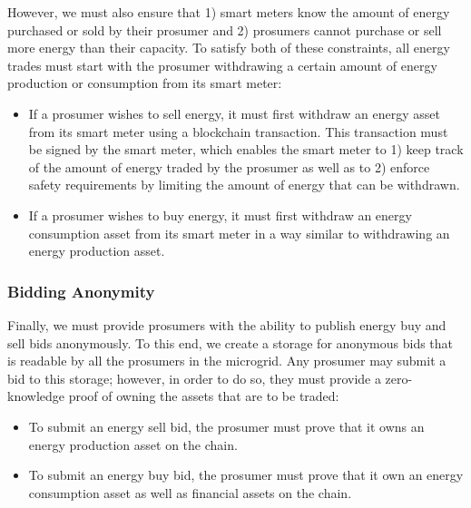 However, we must also ensure that 1) smart meters know the amount of energy purchased or sold by their prosumer and 2) prosumers cannot purchase or sell more energy than their capacity.
To satisfy both of these constraints, all energy trades must start with the prosumer withdrawing a certain amount of energy production or consumption from its smart meter:
\begin{itemize}
\item If a prosumer wishes to sell energy, it must first withdraw an energy asset from its smart meter using a blockchain transaction.
This transaction must be signed by the smart meter, which enables the smart meter to 1) keep track of the amount of energy traded by the prosumer as well as to 2) enforce safety requirements by limiting the amount of energy that can be withdrawn.
\item If a prosumer wishes to buy energy, it must first withdraw an energy consumption asset from its smart meter in a way similar to withdrawing an energy production asset.
\end{itemize}

\subsubsection{Bidding Anonymity}
Finally, we must provide prosumers with the ability to publish energy buy and sell bids anonymously.
To this end, we create a storage for anonymous bids that is readable by all the prosumers in the microgrid.
Any prosumer may submit a bid to this storage; however, in order to do so, they must provide a zero-knowledge proof of owning the assets that are to be traded:
\begin{itemize}
\item To submit an energy sell bid, the prosumer must prove that it owns an energy production asset on the chain.
\item To submit an energy buy bid, the prosumer must prove that it own an energy consumption asset as well as financial assets on the chain.
\end{itemize}


